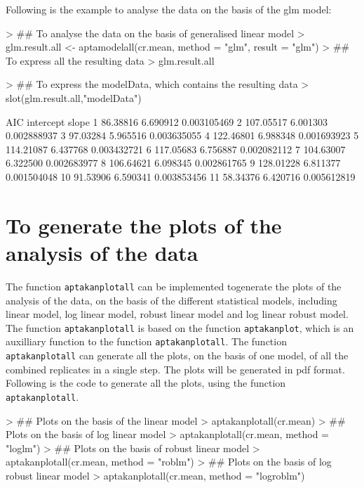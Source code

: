 \documentclass[11pt]{article}
\newcommand{\code}[1]{{\tt #1}}
\begin{document}
Following is the example to analyse the data on the basis of the glm model:
\begin{Schunk}
\begin{Sinput}
> ## To analyse the data on the basis of generalised linear model
> glm.result.all <- aptamodelall(cr.mean, method = "glm", result = "glm")
> ## To express all the resulting data
> glm.result.all
\end{Sinput}
\end{Schunk}

\begin{Schunk}
\begin{Sinput}
> ## To express the modelData, which contains the resulting data
> slot(glm.result.all,"modelData")
\end{Sinput}
\begin{Soutput}
         AIC intercept       slope
1   86.38816  6.690912 0.003105469
2  107.05517  6.001303 0.002888937
3   97.03284  5.965516 0.003635055
4  122.46801  6.988348 0.001693923
5  114.21087  6.437768 0.003432721
6  117.05683  6.756887 0.002082112
7  104.63007  6.322500 0.002683977
8  106.64621  6.098345 0.002861765
9  128.01228  6.811377 0.001504048
10  91.53906  6.590341 0.003853456
11  58.34376  6.420716 0.005612819
\end{Soutput}
\end{Schunk}

\section{To generate the plots of the analysis of the data}
The function \code{aptakanplotall} can be implemented togenerate the plots of the analysis of the
data, on the basis of the different statistical models, including linear model, log linear model,
robust linear model and log linear robust model. The function \code{aptakanplotall} is based on the
function \code{aptakanplot}, which is an auxilliary function to the function \code{aptakanplotall}. The function \code{aptakanplotall} can generate all the plots, on the basis of one model, of all the combined replicates in a single step. The plots will be generated in pdf format. Following is the code to generate all the plots, using the function \code{aptakanplotall}.

\begin{Schunk}
\begin{Sinput}
> ## Plots on the basis of the linear model
> aptakanplotall(cr.mean)
> ## Plots on the basis of log linear model
> aptakanplotall(cr.mean, method = "loglm")
> ## Plots on the basis of robust linear model
> aptakanplotall(cr.mean, method = "roblm")
> ## Plots on the basis of log robust linear model
> aptakanplotall(cr.mean, method = "logroblm")
\end{Sinput}
\end{Schunk}
\end{document}
